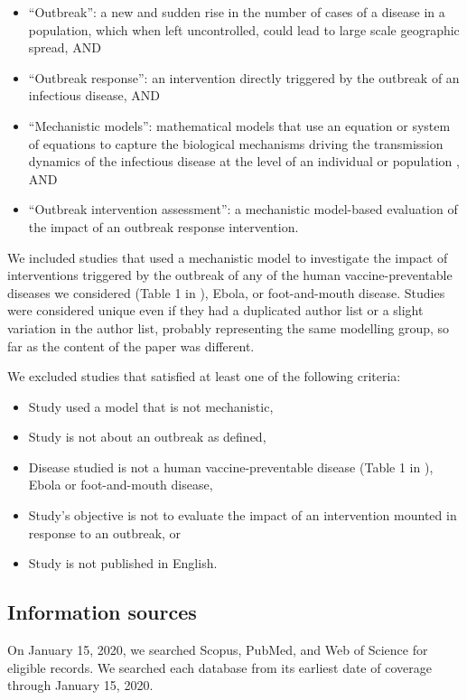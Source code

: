 \documentclass[10pt,letterpaper]{article}
\begin{document}
\begin{itemize}
	\item ``Outbreak'': a new and sudden rise in the number of cases of a disease in a population, which when left uncontrolled, could lead to large scale geographic spread, AND 
	\item ``Outbreak response'': an intervention directly triggered by the outbreak of an infectious disease, AND
	\item ``Mechanistic models'': mathematical models that use an equation or system of equations to capture the biological mechanisms driving the transmission dynamics of the infectious disease at the level of an individual or population \cite{Lessler2016a,Reiner2013}, AND
	\item ``Outbreak intervention assessment'': a mechanistic model-based evaluation of the impact of an outbreak response intervention.
\end{itemize}

We included studies that used a mechanistic model to investigate the impact of interventions triggered by the outbreak of any of the human vaccine-preventable diseases we considered (Table 1 in ), Ebola, or foot-and-mouth disease. Studies were considered unique even if they had a duplicated author list or a slight variation in the author list, probably representing the same modelling group, so far as the content of the paper was different. 


We excluded studies that satisfied at least one of the following criteria: 

\begin{itemize}
	\item Study used a model that is not mechanistic,
	\item Study is not about an outbreak as defined,
	\item Disease studied is not a human vaccine-preventable disease (Table 1 in ), Ebola or foot-and-mouth disease,
	\item Study's objective is not to evaluate the impact of an intervention mounted in response to an outbreak, or
	\item Study is not published in English.
\end{itemize}

\subsection*{Information sources}
On January 15, 2020, we searched Scopus, PubMed, and Web of Science for eligible records. We searched each database from its earliest date of coverage through January 15, 2020. 
\end{document}
